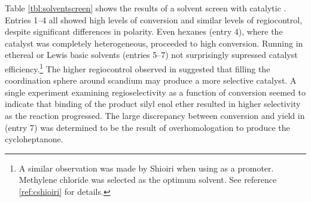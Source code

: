 Table \ref{tbl:solventscreen} shows the results of a solvent screen with
catalytic . Entries 1--4 all showed high levels of conversion and
similar levels of regiocontrol, despite significant differences in polarity.
Even hexanes (entry 4), where the catalyst was completely heterogeneous,
proceeded to high conversion. Running in ethereal or Lewis basic solvents
(entries 5--7) not surprisingly supressed catalyst efficiency.\footnote{A similar observation was
made by Shioiri when using  as a promoter. Methylene chloride was selected as the
optimum solvent. See reference \ref{ref:cshioiri} for details.} The higher regiocontrol observed in
 suggested that filling the coordination sphere around scandium may produce a more selective catalyst. A single experiment examining regioselectivity as a function of conversion seemed to
indicate that binding of the product silyl enol ether resulted in higher
selectivity as the reaction progressed. The large discrepancy between conversion
and yield in  (entry 7) was determined to be the result of
overhomologation to produce the cycloheptanone.


